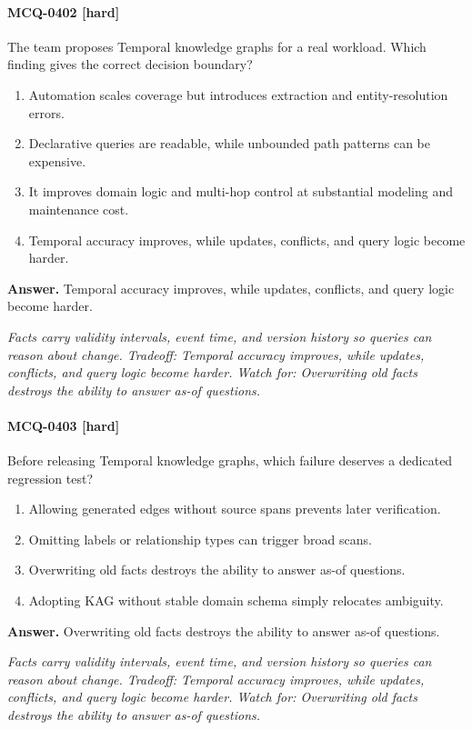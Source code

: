 \paragraph{MCQ-0402 [hard]} The team proposes Temporal knowledge graphs for a real workload. Which finding gives the correct decision boundary?
\begin{enumerate}[label=\Alph*.]
\item Automation scales coverage but introduces extraction and entity-resolution errors.
\item Declarative queries are readable, while unbounded path patterns can be expensive.
\item It improves domain logic and multi-hop control at substantial modeling and maintenance cost.
\item Temporal accuracy improves, while updates, conflicts, and query logic become harder.
\end{enumerate}
\noindent\textbf{Answer.} Temporal accuracy improves, while updates, conflicts, and query logic become harder.
\par\textit{Facts carry validity intervals, event time, and version history so queries can reason about change. Tradeoff: Temporal accuracy improves, while updates, conflicts, and query logic become harder. Watch for: Overwriting old facts destroys the ability to answer as-of questions.}
\paragraph{MCQ-0403 [hard]} Before releasing Temporal knowledge graphs, which failure deserves a dedicated regression test?
\begin{enumerate}[label=\Alph*.]
\item Allowing generated edges without source spans prevents later verification.
\item Omitting labels or relationship types can trigger broad scans.
\item Overwriting old facts destroys the ability to answer as-of questions.
\item Adopting KAG without stable domain schema simply relocates ambiguity.
\end{enumerate}
\noindent\textbf{Answer.} Overwriting old facts destroys the ability to answer as-of questions.
\par\textit{Facts carry validity intervals, event time, and version history so queries can reason about change. Tradeoff: Temporal accuracy improves, while updates, conflicts, and query logic become harder. Watch for: Overwriting old facts destroys the ability to answer as-of questions.}
